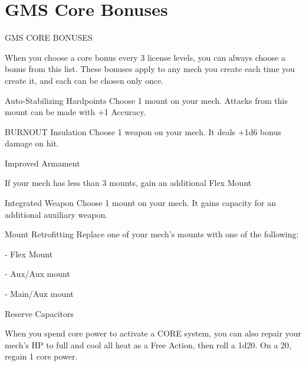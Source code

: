 \section{GMS Core Bonuses}
                                      GMS CORE BONUSES

When you choose a core bonus every 3 license levels, you can always choose a bonus from this
list. These bonuses apply to any mech you create each time you create it, and each can be
chosen only once.


Auto-Stabilizing Hardpoints
Choose 1 mount on your mech. Attacks from this mount can be made with +1 Accuracy.


BURNOUT Insulation
Choose 1 weapon on your mech. It deals +1d6 bonus damage on hit.


Improved Armament

If your mech has less than 3 mounts, gain an additional Flex Mount


Integrated Weapon
Choose 1 mount on your mech. It gains capacity for an additional auxiliary weapon.


Mount Retrofitting
Replace one of your mech’s mounts with one of the following:

	       - Flex Mount

	       - Aux/Aux mount

	       - Main/Aux mount


Reserve Capacitors

When you spend core power to activate a CORE system, you can also repair your mech’s HP to
full and cool all heat as a Free Action, then roll a 1d20. On a 20, regain 1 core power.

